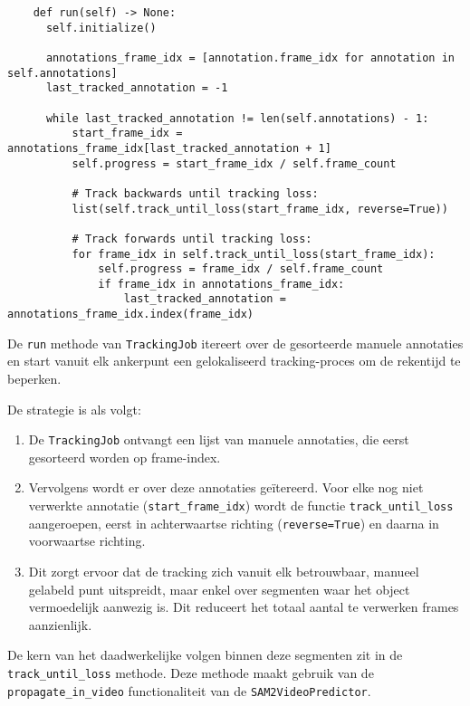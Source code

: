 \begin{listing}
  \begin{verbatim}
    def run(self) -> None:
      self.initialize()

      annotations_frame_idx = [annotation.frame_idx for annotation in self.annotations]
      last_tracked_annotation = -1

      while last_tracked_annotation != len(self.annotations) - 1:
          start_frame_idx = annotations_frame_idx[last_tracked_annotation + 1]
          self.progress = start_frame_idx / self.frame_count

          # Track backwards until tracking loss:
          list(self.track_until_loss(start_frame_idx, reverse=True))

          # Track forwards until tracking loss:
          for frame_idx in self.track_until_loss(start_frame_idx):
              self.progress = frame_idx / self.frame_count
              if frame_idx in annotations_frame_idx:
                  last_tracked_annotation = annotations_frame_idx.index(frame_idx)
  \end{verbatim}
  \caption[Kernlogica van de \texttt{TrackingJob} voor efficiënte verwerking]{
    De \texttt{run} methode van \texttt{TrackingJob} itereert over de gesorteerde manuele annotaties en start vanuit elk ankerpunt een 
    gelokaliseerd tracking-proces om de rekentijd te beperken.
  }
\end{listing}

De strategie is als volgt:
\begin{enumerate}
\item De \texttt{TrackingJob} ontvangt een lijst van manuele annotaties, die eerst gesorteerd worden op frame-index.
\item Vervolgens wordt er over deze annotaties geïtereerd. Voor elke nog niet verwerkte annotatie (\texttt{start\_frame\_idx}) 
wordt de functie \texttt{track\_until\_loss} aangeroepen, eerst in achterwaartse richting (\texttt{reverse=True}) en daarna in voorwaartse richting.
\item Dit zorgt ervoor dat de tracking zich vanuit elk betrouwbaar, manueel gelabeld punt uitspreidt, 
maar enkel over segmenten waar het object vermoedelijk aanwezig is. Dit reduceert het totaal aantal te verwerken frames aanzienlijk.
\end{enumerate}

De kern van het daadwerkelijke volgen binnen deze segmenten zit in de \texttt{track\_until\_loss} methode. 
Deze methode maakt gebruik van de \texttt{propagate\_in\_video} functionaliteit van de \texttt{SAM2VideoPredictor}.

